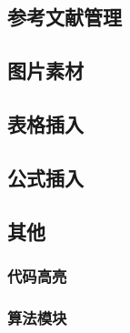 \subsection{参考文献管理}

\subsection{图片素材}

\subsection{表格插入}

\subsection{公式插入}

\subsection{其他}

\subsubsection{代码高亮}

\subsubsection{算法模块}
